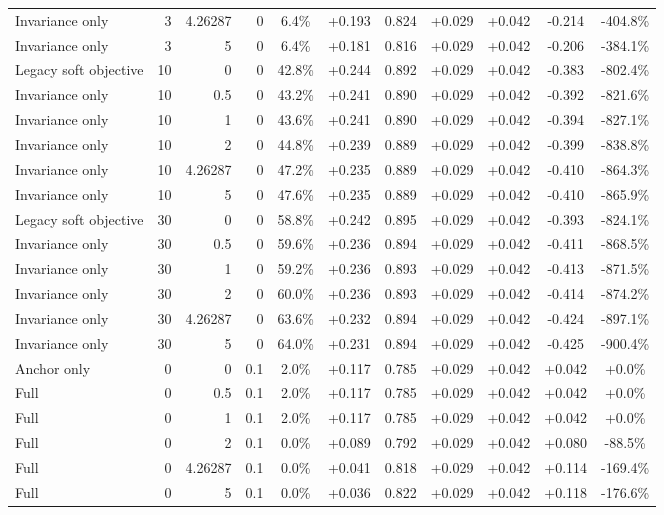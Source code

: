 \begin{table}[htbp]
\begin{tabular}{lrrrccccccc}
Invariance only & 3 & 4.26287 & 0 & 6.4\% & +0.193 & 0.824 & +0.029 & +0.042 & -0.214 & -404.8\% \\
Invariance only & 3 & 5 & 0 & 6.4\% & +0.181 & 0.816 & +0.029 & +0.042 & -0.206 & -384.1\% \\
Legacy soft objective & 10 & 0 & 0 & 42.8\% & +0.244 & 0.892 & +0.029 & +0.042 & -0.383 & -802.4\% \\
Invariance only & 10 & 0.5 & 0 & 43.2\% & +0.241 & 0.890 & +0.029 & +0.042 & -0.392 & -821.6\% \\
Invariance only & 10 & 1 & 0 & 43.6\% & +0.241 & 0.890 & +0.029 & +0.042 & -0.394 & -827.1\% \\
Invariance only & 10 & 2 & 0 & 44.8\% & +0.239 & 0.889 & +0.029 & +0.042 & -0.399 & -838.8\% \\
Invariance only & 10 & 4.26287 & 0 & 47.2\% & +0.235 & 0.889 & +0.029 & +0.042 & -0.410 & -864.3\% \\
Invariance only & 10 & 5 & 0 & 47.6\% & +0.235 & 0.889 & +0.029 & +0.042 & -0.410 & -865.9\% \\
Legacy soft objective & 30 & 0 & 0 & 58.8\% & +0.242 & 0.895 & +0.029 & +0.042 & -0.393 & -824.1\% \\
Invariance only & 30 & 0.5 & 0 & 59.6\% & +0.236 & 0.894 & +0.029 & +0.042 & -0.411 & -868.5\% \\
Invariance only & 30 & 1 & 0 & 59.2\% & +0.236 & 0.893 & +0.029 & +0.042 & -0.413 & -871.5\% \\
Invariance only & 30 & 2 & 0 & 60.0\% & +0.236 & 0.893 & +0.029 & +0.042 & -0.414 & -874.2\% \\
Invariance only & 30 & 4.26287 & 0 & 63.6\% & +0.232 & 0.894 & +0.029 & +0.042 & -0.424 & -897.1\% \\
Invariance only & 30 & 5 & 0 & 64.0\% & +0.231 & 0.894 & +0.029 & +0.042 & -0.425 & -900.4\% \\
Anchor only & 0 & 0 & 0.1 & 2.0\% & +0.117 & 0.785 & +0.029 & +0.042 & +0.042 & +0.0\% \\
Full & 0 & 0.5 & 0.1 & 2.0\% & +0.117 & 0.785 & +0.029 & +0.042 & +0.042 & +0.0\% \\
Full & 0 & 1 & 0.1 & 2.0\% & +0.117 & 0.785 & +0.029 & +0.042 & +0.042 & +0.0\% \\
Full & 0 & 2 & 0.1 & 0.0\% & +0.089 & 0.792 & +0.029 & +0.042 & +0.080 & -88.5\% \\
Full & 0 & 4.26287 & 0.1 & 0.0\% & +0.041 & 0.818 & +0.029 & +0.042 & +0.114 & -169.4\% \\
Full & 0 & 5 & 0.1 & 0.0\% & +0.036 & 0.822 & +0.029 & +0.042 & +0.118 & -176.6\% \\

\end{tabular}
\end{table}
